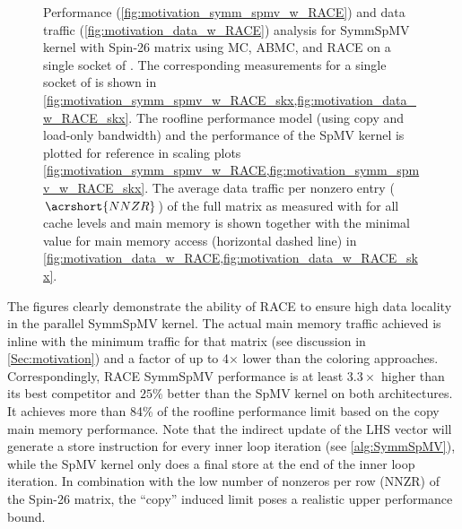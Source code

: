 \begin{figure}[tbp]
 	\caption{Performance (\cref{fig:motivation_symm_spmv_w_RACE}) and data traffic (\cref{fig:motivation_data_w_RACE}) analysis for \acrshort{SymmSpMV} kernel with Spin-26 matrix using \acrshort{MC}, \acrshort{ABMC}, and \acrshort{RACE} on a single socket of \IVB. The corresponding measurements for a single socket of \SKX is shown in \cref{fig:motivation_symm_spmv_w_RACE_skx,fig:motivation_data_w_RACE_skx}. The roofline performance model (using copy and load-only bandwidth) and the performance of the \acrshort{SpMV} kernel is plotted for reference in scaling plots \cref{fig:motivation_symm_spmv_w_RACE,fig:motivation_symm_spmv_w_RACE_skx}. The average data traffic per nonzero entry ($\acrshort{NNZR}$) of the full matrix as measured with \LIKWID for all cache levels and main memory is shown together with the minimal value for main memory access (horizontal dashed line) in \cref{fig:motivation_data_w_RACE,fig:motivation_data_w_RACE_skx}.}
 	\label{fig:motivation_w_RACE}
 \end{figure}
The figures clearly demonstrate the ability of \acrshort{RACE} to ensure high data locality in the parallel \acrshort{SymmSpMV} kernel. The actual main memory traffic achieved is inline with the minimum traffic for that matrix (see discussion in \cref{Sec:motivation}) and a factor of up to 4$\times$ lower than the coloring approaches. Correspondingly, \acrshort{RACE} \acrshort{SymmSpMV} performance is at least $3.3\times$ higher than its best competitor and $25\%$ better than the \acrshort{SpMV} kernel on both architectures. It achieves more than 84\% of the roofline performance limit based on the copy main memory performance. Note that the indirect update of the LHS vector will generate a store instruction for every inner loop iteration (see \cref{alg:SymmSpMV}), while the \acrshort{SpMV} kernel only does a final store at the end of the inner loop iteration. In combination with the low number of nonzeros per row (\acrshort{NNZR}) of the Spin-26 matrix, the ``copy'' induced limit poses a realistic upper performance bound.  
%
